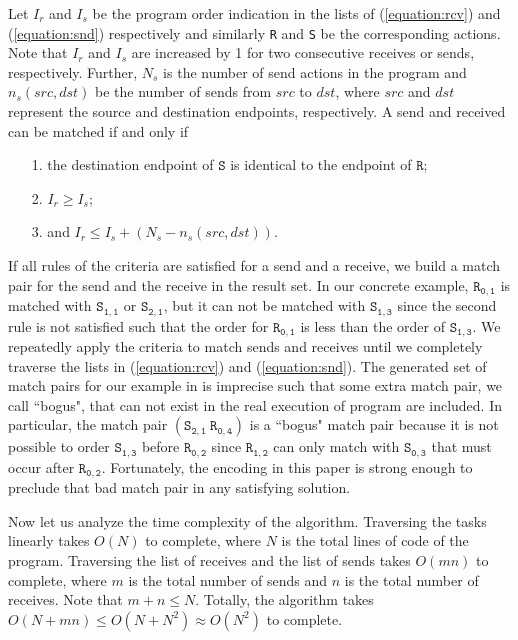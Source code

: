 Let $I_r$ and $I_s$ be the program order indication in the lists of (\ref{equation:rcv}) and (\ref{equation:snd}) respectively and similarly \texttt{R} and \texttt{S} be the corresponding actions. Note that $I_r$ and $I_s$ are increased by 1 for two consecutive receives or sends, respectively. Further, $N_s$ is the number of send actions in the program and $n_s(\mathit{src},\mathit{dst})$ be the number of sends from $\mathit{src}$ to $\mathit{dst}$, where $\mathit{src}$ and $\mathit{dst}$ represent the source and destination endpoints, respectively. A send and received can be matched if and only if
\begin{itemize}
\item[1.] the destination endpoint of $\mathtt{S}$ is identical to the endpoint of $\mathtt{R}$;
\item[2.] $I_r \geq I_s$;
\item[3.] and $I_r \leq I_s + (N_s - n_s(\mathit{src},\mathit{dst}))$.
\end{itemize}
If all rules of the criteria are satisfied for a send and a receive, we build a match pair for the send and the receive in the result set. In our concrete example, $\mathtt{R_{0,1}}$ is matched with $\mathtt{S_{1,1}}$ or $\mathtt{S_{2,1}}$, but it can not be matched with $\mathtt{S_{1,3}}$ since the second rule is not satisfied such that the order for $\mathtt{R_{0,1}}$ is less than the order of $\mathtt{S_{1,3}}$. We repeatedly apply the criteria to match sends and receives until we completely traverse the lists in (\ref{equation:rcv}) and (\ref{equation:snd}). The generated set of match pairs for our example in  is imprecise such that some extra match pair, we call ``bogus", that can not exist in the real execution of program are included. In particular, the match pair $(\mathtt{S_{2,1}}\ \mathtt{R_{0,4}})$ is a ``bogus" match pair because it is not possible to order $\mathtt{S_{1,3}}$ before $\mathtt{R_{0,2}}$ since $\mathtt{R_{1,2}}$ can only match with $\mathtt{S_{0,3}}$ that must occur after $\mathtt{R_{0,2}}$. Fortunately, the encoding in this paper is strong enough to preclude that bad match pair in any satisfying solution.


Now let us analyze the time complexity of the algorithm. Traversing the tasks linearly takes $O(N)$ to complete, where $N$ is the total lines of code of the program. Traversing the list of receives and the list of sends takes $O(mn)$ to complete, where $m$ is the total number of sends and $n$ is the total number of receives. Note that $m + n \le N$. Totally, the algorithm takes $O(N + mn) \leq O(N + N^2) \approx O(N^2)$ to complete.

